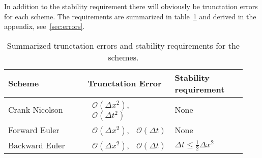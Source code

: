 \documentclass[aps,reprint]{revtex4-1}
\newcommand{\bigO}[1]{\ensuremath{\mathop{}\mathopen{}\mathcal{O}\mathopen{}\left(#1\right)}}
\begin{document}
In addition to the stability requirement there will obviously be trunctation errors
for each scheme. The requirements are summarized in table~\ref{table:errors} and derived in the
appendix, see~\ref{sec:errors}.
\begin{table}[H]
\centering
\caption{Summarized trunctation errors and stability requirements for the schemes.}
\label{table:errors}
\begin{tabular}{p{0.31\linewidth}|p{0.34\linewidth}|p{0.28\linewidth}}
\hline
Scheme         & Trunctation Error                          & Stability requirement                     \\ \hline
Crank-Nicolson & $\bigO{\Delta{x^2}}$, $\bigO{\Delta{t^2}}$ & None                                      \\
Forward Euler  & $\bigO{\Delta{x^2}}$, $\bigO{\Delta{t}}$   & None                                      \\
Backward Euler & $\bigO{\Delta{x^2}}$, $\bigO{\Delta{t}}$   & $\Delta{t} \leq \frac{1}{2} \Delta{x^2}$  \\ \hline
\end{tabular}
\end{table}
\end{document}
